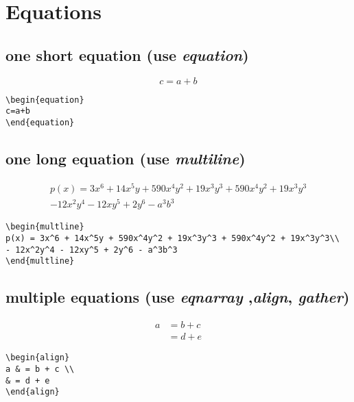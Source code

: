 \documentclass[12pt]{article}
\begin{document}
\section{Equations}

\subsection{one short equation (use \textit{equation})}
\begin{equation}
c=a+b
\end{equation}

\begin{lstlisting}
\begin{equation}
c=a+b
\end{equation}
\end{lstlisting}

\subsection{one long equation (use \textit{multiline})}
\begin{multline}
p(x) = 3x^6 + 14x^5y + 590x^4y^2 + 19x^3y^3 + 590x^4y^2 + 19x^3y^3\\ 
- 12x^2y^4 - 12xy^5 + 2y^6 - a^3b^3
\end{multline}

\begin{lstlisting}
\begin{multline}
p(x) = 3x^6 + 14x^5y + 590x^4y^2 + 19x^3y^3 + 590x^4y^2 + 19x^3y^3\\ 
- 12x^2y^4 - 12xy^5 + 2y^6 - a^3b^3
\end{multline}
\end{lstlisting}

\subsection{multiple equations (use \textit{eqnarray} ,\textit{align}, \textit{gather})}

\begin{align}
a & = b + c \\
& = d + e
\end{align}

\begin{lstlisting}
\begin{align}
a & = b + c \\
& = d + e
\end{align}
\end{lstlisting}
\end{document}
